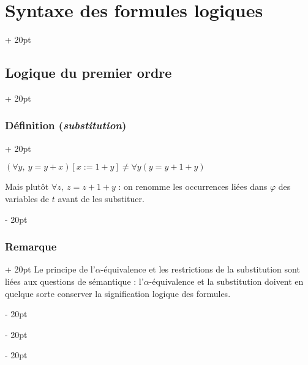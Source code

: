 \documentclass[a4paper, 12pt, twoside]{article}
\newcommand{\ind}[1][20pt]{\advance\leftskip + #1}
\newcommand{\deind}[1][20pt]{\advance\leftskip - #1}
\newenvironment{indt}[2][20pt]{#2 \par \ind[#1]}{\par \deind} %
\begin{document}
\begin{indt}{\section{Syntaxe des formules logiques}}
\begin{indt}{\subsection{Logique du premier ordre}}
\begin{indt}{\subsubsection{Définition (\textit{substitution})}}
                \vspace{12pt}
                
                $(\forall y,\ y = y + x)[x := 1 + y] \neq \forall y (y = y + 1 + y)$
                
                Mais plutôt $\forall z,\ z = z + 1 + y$ : on renomme les occurrences liées dans $\varphi$ des variables de $t$ avant de les substituer.
            \end{indt}
            
            \vspace{12pt}
            
            \begin{indt}{\subsubsection{Remarque}}
                Le principe de l'$\alpha$-équivalence et les restrictions de la substitution sont liées aux questions de sémantique : l'$\alpha$-équivalence et la substitution doivent en quelque sorte conserver la signification logique des formules.
            \end{indt}
        \end{indt}
        
    \end{indt}
    
    \vspace{12pt}
    
\end{document}
